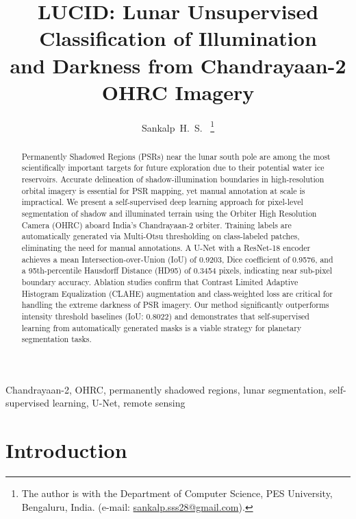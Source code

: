 \documentclass[journal]{IEEEtran}
\begin{document}
\title{LUCID: Lunar Unsupervised Classification of Illumination\\ and Darkness from Chandrayaan-2 OHRC Imagery}

\author{Sankalp~H.~S.~
\thanks{The author is with the Department of Computer Science, PES University, Bengaluru, India. (e-mail: \href{mailto:sankalp.sss28@gmail.com}{sankalp.sss28@gmail.com}).}}

\maketitle

\begin{abstract}
Permanently Shadowed Regions (PSRs) near the lunar south pole are among the most scientifically important targets for future exploration due to their potential water ice reservoirs. Accurate delineation of shadow-illumination boundaries in high-resolution orbital imagery is essential for PSR mapping, yet manual annotation at scale is impractical. We present a self-supervised deep learning approach for pixel-level segmentation of shadow and illuminated terrain using the Orbiter High Resolution Camera (OHRC) aboard India's Chandrayaan-2 orbiter. Training labels are automatically generated via Multi-Otsu thresholding on class-labeled patches, eliminating the need for manual annotations. A U-Net with a ResNet-18 encoder achieves a mean Intersection-over-Union (IoU) of 0.9203, Dice coefficient of 0.9576, and a 95th-percentile Hausdorff Distance (HD95) of 0.3454 pixels, indicating near sub-pixel boundary accuracy. Ablation studies confirm that Contrast Limited Adaptive Histogram Equalization (CLAHE) augmentation and class-weighted loss are critical for handling the extreme darkness of PSR imagery. Our method significantly outperforms intensity threshold baselines (IoU: 0.8022) and demonstrates that self-supervised learning from automatically generated masks is a viable strategy for planetary segmentation tasks.
\end{abstract}

\begin{IEEEkeywords}
Chandrayaan-2, OHRC, permanently shadowed regions, lunar segmentation, self-supervised learning, U-Net, remote sensing
\end{IEEEkeywords}

\section{Introduction}
\label{sec:intro}
\end{document}
